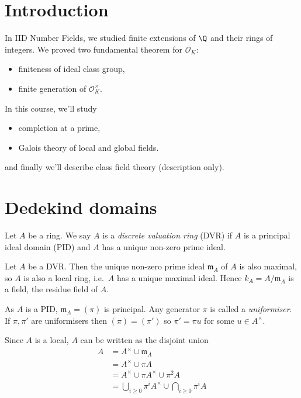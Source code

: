 \documentclass[a4paper]{article}
\theoremstyle{definition}
\renewcommand*{\O}{\mathcal{O}}
\begin{document}


\tableofcontents

\setcounter{section}{-1}

\section{Introduction}

In IID Number Fields, we studied finite extensions of \(\Q\) and their rings of integers. We proved two fundamental theorem for \(\O_K\):
\begin{itemize}
\item finiteness of ideal class group,
\item finite generation of \(\O_K^\times\).
\end{itemize}

In this course, we'll study
\begin{itemize}
\item completion at a prime,
\item Galois theory of local and global fields.
\end{itemize}
and finally we'll describe class field theory (description only).

\section{Dedekind domains}

\begin{definition}
  Let \(A\) be a ring. We say \(A\) is a \emph{discrete valuation ring} (DVR) if \(A\) is a principal ideal domain (PID) and \(A\) has a unique non-zero prime ideal.
\end{definition}

Let \(A\) be a DVR. Then the unique non-zero prime ideal \(\mathfrak m_A\) of \(A\) is also maximal, so \(A\) is also a local ring, i.e.\ \(A\) has a unique maximal ideal. Hence \(k_A = A/\mathfrak m_A\) is a field, the residue field of \(A\).

As \(A\) is a PID, \(\mathfrak m_A = (\pi)\) is principal. Any generator \(\pi\) is called a \emph{uniformiser}. If \(\pi, \pi'\) are uniformisers then \((\pi) = (\pi')\) so \(\pi' = \pi u\) for some \(u \in A^\times\).

Since \(A\) is a local, \(A\) can be written as the disjoint union
\begin{align*}
  A &= A^\times \cup \mathfrak m_A \\
    &= A^\times \cup \pi A \\
    &= A^\times \cup \pi A^\times \cup \pi^2 A \\
    &= \bigcup_{i \geq 0} \pi^i A^\times \cup \bigcap_{i \geq 0} \pi^i A
\end{align*}
\end{document}

